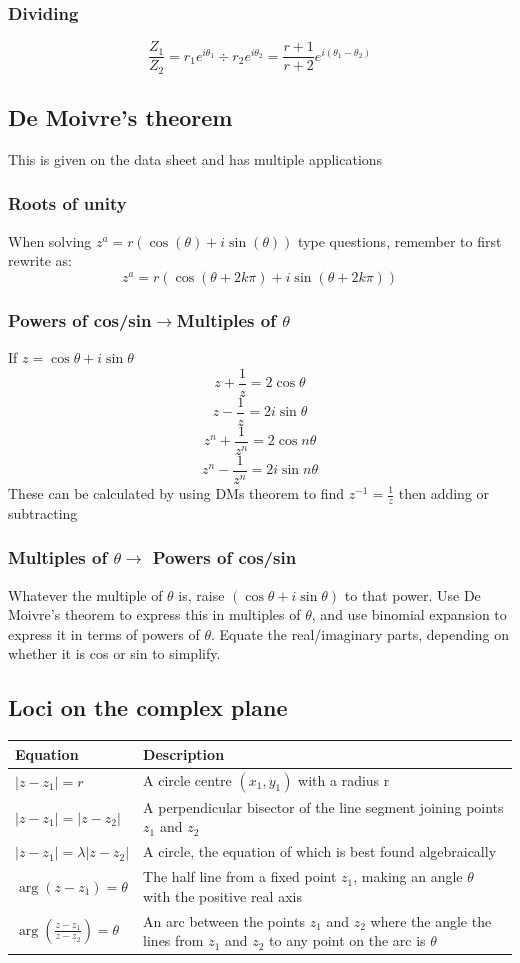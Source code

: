\documentclass{article}[18pt]
\begin{document}
\subsubsection{Dividing}
$$\frac{Z_1}{Z_2}=r_1e^{i\theta_1}\div r_2e^{i\theta_2}=\frac{r+1}{r+2} e^{i(\theta_1-\theta_2)}$$
\subsection{De Moivre's theorem}
This is given on the data sheet and has multiple applications
\subsubsection{Roots of unity}
When solving $z^a=r(\cos(\theta)+i\sin(\theta))$ type questions, remember to first rewrite as:
$$z^a=r(\cos(\theta+2k\pi)+i\sin(\theta+2k\pi))$$
\subsubsection{Powers of cos/sin$\rightarrow$Multiples of $\theta$}
If $z=\cos\theta+i\sin\theta$
$$z+\frac{1}{z}=2\cos\theta$$
$$z-\frac{1}{z}=2i\sin\theta$$
$$z^n+\frac{1}{z^n}=2\cos n\theta$$
$$z^n-\frac{1}{z^n}=2i\sin n\theta$$
These can be calculated by using DMs theorem to find $z^{-1} =\frac{1}{z}$ then adding or subtracting
\subsubsection{Multiples of $\theta\rightarrow$ Powers of cos/sin}
Whatever the multiple of $\theta$ is, raise $(\cos\theta+i\sin\theta)$ to that power. Use De Moivre's theorem to express this in multiples of $\theta$, and use binomial expansion to express it in terms of powers of $\theta$. Equate the real/imaginary parts, depending on whether it is cos or sin to simplify.

\subsection{Loci on the complex plane}
{\renewcommand{\arraystretch}{2}
\begin{tabularx}{\textwidth}{|X|X|}
\hline
Equation&Description\\
\hline
{\Large$|z-z_1|=r$}&A circle centre $(x_1,y_1)$ with a radius r\\
\hline
{\Large$|z-z_1|=|z-z_2|$}&A perpendicular bisector of the line segment joining points $z_1$ and $z_2$\\
\hline
{\Large$|z-z_1|=\lambda|z-z_2|$}&A circle, the equation of which is best found algebraically\\
\hline
{\Large$\arg(z-z_1)=\theta$}&The half line from a fixed point $z_1$, making an angle $\theta$ with the positive real axis\\
\hline
{\Large$\arg(\frac{z-z_1}{z-z_2})=\theta$}&An arc between the points $z_1$ and $z_2$ where the angle the lines from $z_1$ and $z_2$ to any point on the arc is $\theta$\\
\hline
\end{tabularx}}
\end{document}
